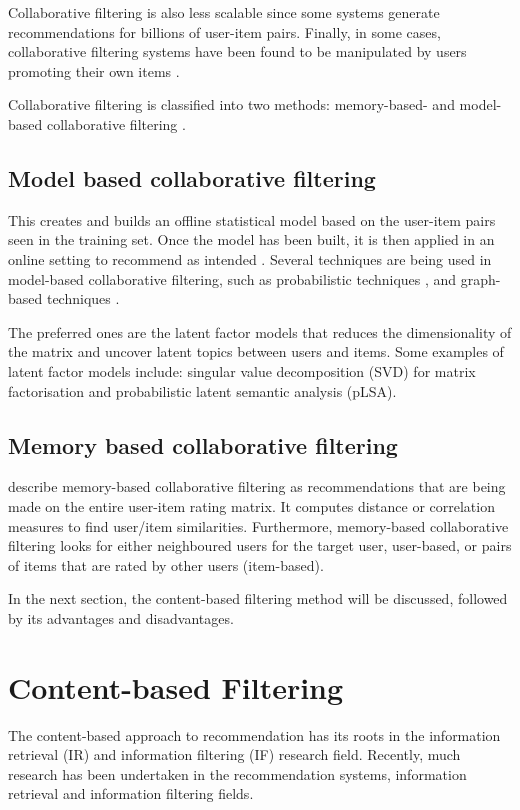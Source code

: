 Collaborative filtering is also less scalable since some systems generate recommendations for billions of user-item pairs. Finally, in some cases, collaborative filtering systems have been found to be manipulated by users promoting their own items \cite{resnick1994grouplens}.

Collaborative filtering is classified into two methods: memory-based- and model-based collaborative filtering \cite{naak2009multi}.

\subsection{Model based collaborative filtering} 

This creates and builds an offline statistical model based on the user-item pairs seen in the training set. Once the model has been built, it is then applied in an online setting to recommend as intended \cite{jannach2010recommender}. Several techniques are being used in model-based collaborative filtering, such as probabilistic techniques \cite{pavlov2004collaborative}, and graph- based techniques \cite{clements2009exploiting}.

The preferred ones are the latent factor models that reduces the dimensionality of the matrix and uncover latent topics between users and items. Some examples of latent factor models include: singular value decomposition (SVD) for matrix factorisation \cite{clements2009exploiting} and probabilistic latent semantic analysis (pLSA).


\subsection{Memory based collaborative filtering}
 describe memory-based collaborative filtering as recommendations that are being made on the entire user-item rating matrix. It computes distance or correlation measures to find user/item similarities. Furthermore, memory-based collaborative filtering looks for either neighboured users for the target user, user-based, or pairs of items that are rated by other users (item-based).

In the next section, the content-based filtering method will be discussed, followed by its advantages and disadvantages.

\section{Content-based Filtering} \label{sec:content}
The content-based approach to recommendation has its roots in the information retrieval (IR) and information filtering (IF) research field. Recently, much research has been undertaken in the recommendation systems, information retrieval and information filtering fields.

